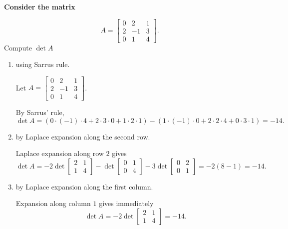 \providecommand{\rank}{\operatorname{r}}
\providecommand{\RR}{\mathbb R}
\providecommand{\CC}{\mathbb C}
\providecommand{\KK}{\mathbb K}

\setcounter{enumi}{41}
\item {\bfseries\boldmath
Consider the matrix
}

\[
A=\begin{bmatrix}0&2&1\\2&-1&3\\0&1&4\end{bmatrix}.
\]
Compute $\det A$

\begin{enumerate}[label=\alph*)]

\item using Sarrus\textquotesingle{} rule.

\begin{answer}
Let $A=\begin{bmatrix}0&2&1\\2&-1&3\\0&1&4\end{bmatrix}$.

By Sarrus' rule,
\[
 \det A=(0\cdot(-1)\cdot4+2\cdot3\cdot0+1\cdot2\cdot1)
 -(1\cdot(-1)\cdot0+2\cdot2\cdot4+0\cdot3\cdot1)=-14.
\]
\end{answer}

\item by Laplace expansion along the second row.

\begin{answer}
Laplace expansion along row $2$ gives
\[
 \det A=-2\det\begin{bmatrix}2&1\\1&4\end{bmatrix}
 -\det\begin{bmatrix}0&1\\0&4\end{bmatrix}
 -3\det\begin{bmatrix}0&2\\0&1\end{bmatrix}=-2(8-1)=-14.
\]
\end{answer}

\item by Laplace expansion along the first column.

\begin{answer}
Expansion along column $1$ gives immediately
\[
 \det A=-2\det\begin{bmatrix}2&1\\1&4\end{bmatrix}=-14.
\]
\end{answer}
\end{enumerate}
